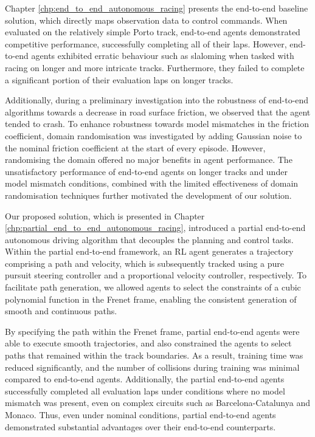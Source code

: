 Chapter \ref{chp:end_to_end_autonomous_racing} presents the end-to-end baseline solution, which directly maps observation data to control commands.
When evaluated on the relatively simple Porto track, end-to-end agents demonstrated competitive performance, successfully completing all of their laps.
However, end-to-end agents exhibited erratic behaviour such as slaloming when tasked with racing on longer and more intricate tracks.
Furthermore, they failed to complete a significant portion of their evaluation laps on longer tracks.


Additionally, during a preliminary investigation into the robustness of end-to-end algorithms towards a decrease in road surface friction, we observed that the agent tended to crash.
To enhance robustness towards model mismatches in the friction coefficient, domain randomisation was investigated by adding Gaussian noise to the nominal friction coefficient at the start of every episode.
However, randomising the domain offered no major benefits in agent performance.
The unsatisfactory performance of end-to-end agents on longer tracks and under model mismatch conditions, combined with the limited effectiveness of domain randomisation techniques further motivated the development of our solution.


Our proposed solution, which is presented in Chapter \ref{chp:partial_end_to_end_autonomous_racing}, introduced a partial end-to-end autonomous driving algorithm  that decouples the planning and control tasks.
Within the partial end-to-end framework, an RL agent generates a trajectory comprising a path and velocity, which is subsequently tracked using a pure pursuit steering controller and a proportional velocity controller, respectively.
To facilitate path generation, we allowed agents to select the constraints of a cubic polynomial function in the Frenet frame, enabling the consistent  generation of smooth and continuous paths.


By specifying the path within the Frenet frame, partial end-to-end agents were able to execute smooth trajectories, and also constrained the agents to select paths that remained within the track boundaries. 
As a result, training time was reduced significantly, and the number of collisions during training was minimal compared to end-to-end agents.
Additionally, the partial end-to-end agents successfully completed all evaluation laps under conditions where no model mismatch was present, even on complex circuits such as Barcelona-Catalunya and Monaco. 
Thus, even under nominal conditions, partial end-to-end agents demonstrated substantial advantages over their end-to-end counterparts.


